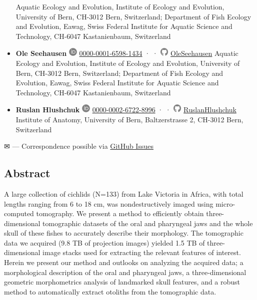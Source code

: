 \begin{itemize}
  Aquatic Ecology and Evolution, Institute of Ecology and Evolution, University of Bern, CH-3012 Bern, Switzerland; Department of Fish Ecology and Evolution, Eawag, Swiss Federal Institute for Aquatic Science and Technology, CH-6047 Kastanienbaum, Switzerland
\item
  \textbf{Ole Seehausen}
  \includegraphics[width=0.16667in,height=0.16667in]{images/orcid.svg}
  \href{https://orcid.org/0000-0001-6598-1434}{0000-0001-6598-1434} ·
  · \includegraphics[width=0.16667in,height=0.16667in]{images/github.svg}
  \href{https://github.com/OleSeehausen}{OleSeehausen}
  Aquatic Ecology and Evolution, Institute of Ecology and Evolution, University of Bern, CH-3012 Bern, Switzerland; Department of Fish Ecology and Evolution, Eawag, Swiss Federal Institute for Aquatic Science and Technology, CH-6047 Kastanienbaum, Switzerland
\item
  \textbf{Ruslan Hlushchuk}
  \includegraphics[width=0.16667in,height=0.16667in]{images/orcid.svg}
  \href{https://orcid.org/0000-0002-6722-8996}{0000-0002-6722-8996} ·
  · \includegraphics[width=0.16667in,height=0.16667in]{images/github.svg}
  \href{https://github.com/RuslanHlushchuk}{RuslanHlushchuk}
  Institute of Anatomy, University of Bern, Baltzerstrasse 2, CH-3012 Bern, Switzerland
\end{itemize}

\leavevmode{}%
✉ --- Correspondence possible via \href{https://github.com/habi/EAWAG-manuscript/issues}{GitHub Issues}

\hypertarget{abstract}{%
\subsection{Abstract}\label{abstract}}

A large collection of cichlids (N=133) from Lake Victoria in Africa, with total lengths ranging from 6 to 18 cm, was nondestructively imaged using micro-computed tomography.
We present a method to efficiently obtain three-dimensional tomographic datasets of the oral and pharyngeal jaws and the whole skull of these fishes to accurately describe their morphology.
The tomographic data we acquired (9.8 TB of projection images) yielded 1.5 TB of three-dimensional image stacks used for extracting the relevant features of interest.
Herein we present our method and outlooks on analyzing the acquired data; a morphological description of the oral and pharyngeal jaws, a three-dimensional geometric morphometrics analysis of landmarked skull features, and a robust method to automatically extract otoliths from the tomographic data.

